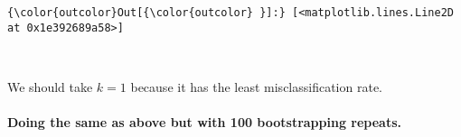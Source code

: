 \documentclass[11pt]{article}
\begin{document}
            \begin{Verbatim}[commandchars=\\\{\}]
{\color{outcolor}Out[{\color{outcolor} }]:} [<matplotlib.lines.Line2D at 0x1e392689a58>]
\end{Verbatim}
        
    \begin{center}
    \end{center}
    { \hspace*{\fill} \\}
    
    We should take \(k = 1\) because it has the least misclassification
rate.

    \paragraph{Doing the same as above but with 100 bootstrapping
repeats.}\label{doing-the-same-as-above-but-with-100-bootstrapping-repeats.}
\end{document}
